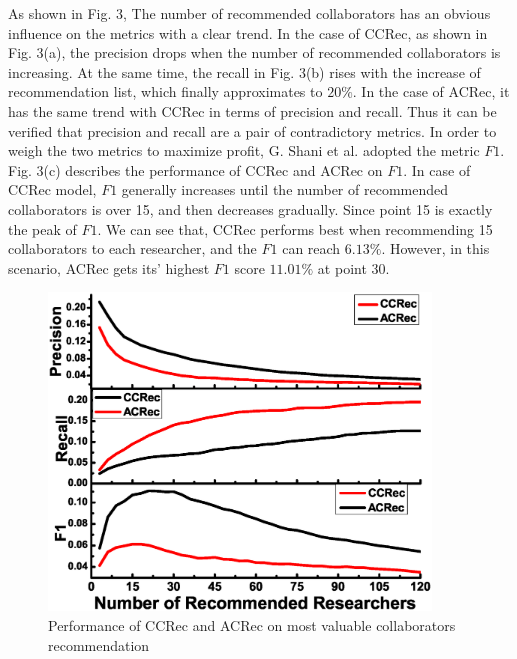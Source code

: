 \documentclass[review]{elsarticle}
\begin{document}
As shown in Fig. 3, The number of recommended collaborators has an obvious influence on the metrics with a clear trend. In the case of CCRec, as shown in Fig. 3(a), the precision drops when the number of recommended collaborators is increasing. At the same time, the recall in Fig. 3(b) rises with the increase of recommendation list, which finally approximates to $20\%$. In the case of ACRec, it has the same trend with CCRec in terms of precision and recall. Thus it can be verified that precision and recall are a pair of contradictory metrics. In order to weigh the two metrics to maximize profit, G. Shani et al. \cite{shani2011evaluating} adopted the metric $F1$. Fig. 3(c) describes the performance of CCRec and ACRec on $F1$. In case of CCRec model, $F1$ generally increases until the number of recommended collaborators is over 15, and then decreases gradually. Since point 15 is exactly the peak of $F1$. We can see that, CCRec performs best when recommending 15 collaborators to each researcher, and the $F1$ can reach $6.13\%$. However, in this scenario, ACRec gets its' highest $F1$ score $11.01\%$ at point 30.


\begin{figure}
\centering
\includegraphics [width=4in]{Fig3.eps}
\caption{Performance of CCRec and ACRec on most valuable collaborators recommendation}
\end{figure}
\end{document}
